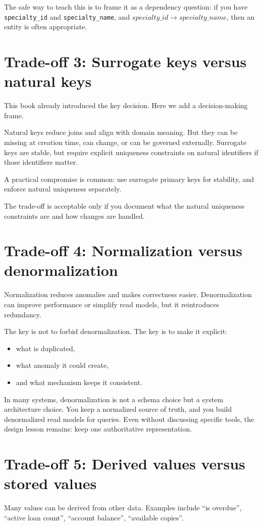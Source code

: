 The safe way to teach this is to frame it as a dependency question:
if you have \texttt{specialty\_id} and \texttt{specialty\_name}, and \(specialty\_id \rightarrow specialty\_name\), then an entity is often appropriate.

\section{Trade-off 3: Surrogate keys versus natural keys}
This book already introduced the key decision.
Here we add a decision-making frame.

Natural keys reduce joins and align with domain meaning.
But they can be missing at creation time, can change, or can be governed externally.
Surrogate keys are stable, but require explicit uniqueness constraints on natural identifiers if those identifiers matter.

A practical compromise is common:
use surrogate primary keys for stability, and enforce natural uniqueness separately.

The trade-off is acceptable only if you document what the natural uniqueness constraints are and how changes are handled.

\section{Trade-off 4: Normalization versus denormalization}
Normalization reduces anomalies and makes correctness easier.
Denormalization can improve performance or simplify read models, but it reintroduces redundancy.

The key is not to forbid denormalization.
The key is to make it explicit:
\begin{itemize}[leftmargin=*,nosep]
  \item what is duplicated,
  \item what anomaly it could create,
  \item and what mechanism keeps it consistent.
\end{itemize}

In many systems, denormalization is not a schema choice but a system architecture choice.
You keep a normalized source of truth, and you build denormalized read models for queries.
Even without discussing specific tools, the design lesson remains: keep one authoritative representation.

\section{Trade-off 5: Derived values versus stored values}
Many values can be derived from other data.
Examples include “is overdue”, “active loan count”, “account balance”, “available copies”.


